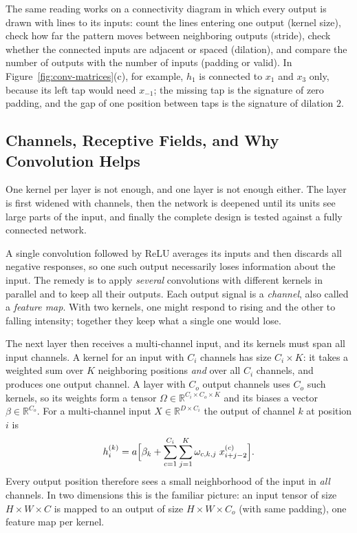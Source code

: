 \noindent
The same reading works on a connectivity diagram in which every output is drawn
with lines to its inputs: count the lines entering one output (kernel size),
check how far the pattern moves between neighboring outputs (stride), check
whether the connected inputs are adjacent or spaced (dilation), and compare the
number of outputs with the number of inputs (padding or valid). In
Figure~\ref{fig:conv-matrices}(c), for example, $h_1$ is connected to $x_1$ and
$x_3$ only, because its left tap would need $x_{-1}$; the missing tap is the
signature of zero padding, and the gap of one position between taps is the
signature of dilation $2$.

\subsection{Channels, Receptive Fields, and Why Convolution Helps}

One kernel per layer is not enough, and one layer is not enough either. The
layer is first widened with channels, then the network is deepened until its
units see large parts of the input, and finally the complete design is tested
against a fully connected network.

A single convolution followed by ReLU averages its inputs and then discards all
negative responses, so one such output necessarily loses information about the
input. The remedy is to apply \emph{several} convolutions with different kernels
in parallel and to keep all their outputs. Each output signal is a
\emph{channel}, also called a \emph{feature map}. With two kernels, one might
respond to rising and the other to falling intensity; together they keep what a
single one would lose.

The next layer then receives a multi-channel input, and its kernels must span all
input channels. A kernel for an input with $C_i$ channels has size $C_i\times K$:
it takes a weighted sum over $K$ neighboring positions \emph{and} over all
$C_i$ channels, and produces one output channel. A layer with $C_o$ output
channels uses $C_o$ such kernels, so its weights form a tensor
$\Omega\in\mathbb{R}^{C_i\times C_o\times K}$ and its biases a vector
$\beta\in\mathbb{R}^{C_o}$. For a multi-channel input $X \in
\mathbb{R}^{D\times C_i}$ the output of channel $k$ at position $i$ is
\begin{equation}
  h_{i}^{(k)} = a\Bigl[\beta_k
    + \sum_{c=1}^{C_i}\sum_{j=1}^{K} \omega_{c,k,j}\; x_{i+j-2}^{(c)}\Bigr].
\end{equation}
\noindent
Every output position therefore sees a small neighborhood of the input in
\emph{all} channels. In two dimensions this is the familiar picture: an input
tensor of size $H\times W\times C$ is mapped to an output of size
$H\times W\times C_o$ (with same padding), one feature map per kernel.

